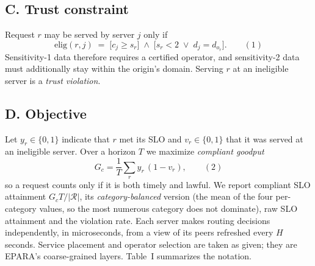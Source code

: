 \documentclass{article}
\begin{document}
\subsection*{C. Trust constraint}
Request $r$ may be served by server $j$ only if
\[ \mathrm{elig}(r,j)\;=\;\big[c_j\ge s_r\big]\;\wedge\;\big[s_r<2\;\vee\;d_j=d_{o_r}\big]. \qquad (1) \]
Sensitivity-1 data therefore requires a certified operator, and sensitivity-2 data must additionally stay within the origin's domain. Serving $r$ at an ineligible server is a \emph{trust violation}.

\subsection*{D. Objective}
Let $y_r\in\{0,1\}$ indicate that $r$ met its SLO and $v_r\in\{0,1\}$ that it was served at an ineligible server. Over a horizon $T$ we maximize \emph{compliant goodput}
\[ G_c=\frac{1}{T}\sum_{r}y_r\,(1-v_r), \qquad (2) \]
so a request counts only if it is both timely and lawful. We report compliant SLO attainment $G_cT/|\mathcal{R}|$, its \emph{category-balanced} version (the mean of the four per-category values, so the most numerous category does not dominate), raw SLO attainment and the violation rate. Each server makes routing decisions independently, in microseconds, from a view of its peers refreshed every $H$ seconds. Service placement and operator selection are taken as given; they are EPARA's coarse-grained layers. Table~I summarizes the notation.
\end{document}
